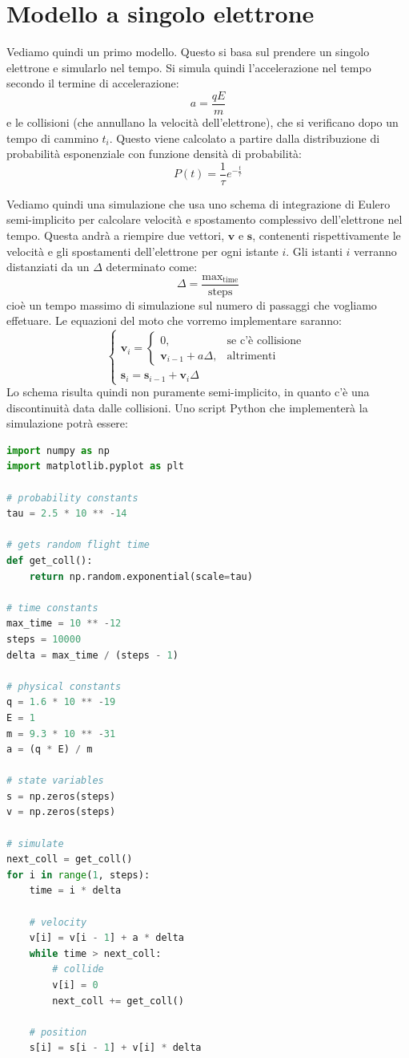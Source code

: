 \documentclass[a4paper,11pt]{article}
\begin{document}
\section{Modello a singolo elettrone}
Vediamo quindi un primo modello. Questo si basa sul prendere un singolo elettrone e simularlo nel tempo. Si simula quindi l'accelerazione nel tempo secondo il termine di accelerazione:
$$
a = \frac{q E}{m}
$$
e le collisioni (che annullano la velocità dell'elettrone), che si verificano dopo un tempo di cammino $t_i$. Questo viene calcolato a partire dalla distribuzione di probabilità esponenziale con funzione densità di probabilità:
$$
P(t) = \frac{1}{\tau} e^{-\frac{t}{\tau}}
$$

Vediamo quindi una simulazione che usa uno schema di integrazione di Eulero semi-implicito per calcolare velocità e spostamento complessivo dell'elettrone nel tempo. Questa andrà a riempire due vettori, $\mathbf{v}$ e $\mathbf{s}$, contenenti rispettivamente le velocità e gli spostamenti dell'elettrone per ogni istante $i$. Gli istanti $i$ verranno distanziati da un $\Delta$ determinato come:
$$
\Delta = \frac{\text{max}_\text{time}}{\text{steps}}
$$
cioè un tempo massimo di simulazione sul numero di passaggi che vogliamo effetuare. 
Le equazioni del moto che vorremo implementare saranno:
$$
\begin{cases}
	\mathbf{v}_i = 
	\begin{cases}
		0, & \text{se c'è collisione} \\
		\mathbf{v}_{i - 1} + a \Delta, & \text{altrimenti}
	\end{cases} 
	\\
	\mathbf{s}_i = \mathbf{s}_{i - 1} + \mathbf{v}_i \Delta
\end{cases}
$$
Lo schema risulta quindi non puramente semi-implicito, in quanto c'è una discontinuità data dalle collisioni. Uno script Python che implementerà la simulazione potrà essere:
\begin{lstlisting}[language=python, style=codestyle]
import numpy as np
import matplotlib.pyplot as plt

# probability constants
tau = 2.5 * 10 ** -14

# gets random flight time
def get_coll():
    return np.random.exponential(scale=tau)

# time constants
max_time = 10 ** -12
steps = 10000
delta = max_time / (steps - 1)

# physical constants
q = 1.6 * 10 ** -19
E = 1
m = 9.3 * 10 ** -31
a = (q * E) / m

# state variables
s = np.zeros(steps)
v = np.zeros(steps)

# simulate
next_coll = get_coll()
for i in range(1, steps):
    time = i * delta

    # velocity
    v[i] = v[i - 1] + a * delta
    while time > next_coll:
        # collide
        v[i] = 0
        next_coll += get_coll() 

    # position
    s[i] = s[i - 1] + v[i] * delta
\end{lstlisting}
\end{document}
